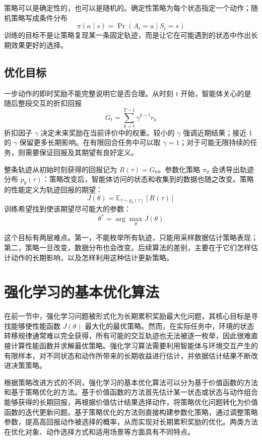 \documentclass[UTF8,a4paper,zihao=-4,oneside,openany]{ctexbook}
\begin{document}
策略可以是确定性的，也可以是随机的。确定性策略为每个状态指定一个动作；随机策略写成条件分布
\begin{equation}
\pi(a\mid s)=\Pr(A_t=a\mid S_t=s)
\end{equation}
训练的目标不是让策略复现某一条固定轨迹，而是让它在可能遇到的状态中作出长期效果更好的选择。

\subsection{优化目标}

一步动作的即时奖励不能完整说明它是否合理。从时刻 \(t\) 开始，智能体关心的是随后整段交互的折扣回报
\begin{equation}
G_t=\sum_{k=t}^{T-1}\gamma^{k-t}r_k
\end{equation}
折扣因子 \(\gamma\) 决定未来奖励在当前评价中的权重。较小的 \(\gamma\) 强调近期结果；接近 1 的 \(\gamma\) 保留更多长期影响。在有限回合任务中可以取 \(\gamma=1\)；对于可能无限持续的任务，则需要保证回报及其期望有良好定义。

整条轨迹从初始时刻获得的回报记为 \(R(\tau)=G_0\)。参数化策略 \(\pi_\theta\) 会诱导出轨迹分布 \(p_\theta(\tau)\)：策略改变后，智能体访问的状态和收集到的数据也随之改变。策略的性能定义为轨迹回报的期望：
\begin{equation}
J(\theta)
=
\mathbb{E}_{\tau\sim p_\theta(\tau)}[R(\tau)]
\end{equation}
训练希望找到使该期望尽可能大的参数：
\begin{equation}
\theta^{*} = \arg\max_{\theta} J(\theta)
\end{equation}

这个目标有两层难点。第一，不能枚举所有轨迹，只能用采样数据估计策略表现；第二，策略一旦改变，数据分布也会改变。后续算法的差别，主要在于它们怎样估计动作的长期影响，以及怎样利用这种估计更新策略。

\section{强化学习的基本优化算法}
在前一节中，强化学习问题被形式化为长期累积奖励最大化问题，其核心目标是寻找能够使性能函数 $J(\theta)$ 最大化的最优策略。然而，在实际任务中，环境的状态转移规律通常难以完全获得，所有可能的交互轨迹也无法被逐一枚举，因此很难直接计算性能函数并求解最优策略。强化学习算法需要利用智能体与环境交互产生的有限样本，对不同状态和动作所带来的长期收益进行估计，并依据估计结果不断改进决策策略。

根据策略改进方式的不同，强化学习的基本优化算法可以分为基于价值函数的方法和基于策略优化的方法。基于价值函数的方法首先估计某一状态或状态与动作组合能够获得的长期回报，再根据价值估计结果选择动作，将策略优化问题转化为价值函数的迭代更新问题。基于策略优化的方法则直接构建参数化策略，通过调整策略参数，提高高回报动作被选择的概率，从而实现对长期累积奖励的优化。两类方法在优化对象、动作选择方式和适用场景等方面具有不同特点。
\end{document}
